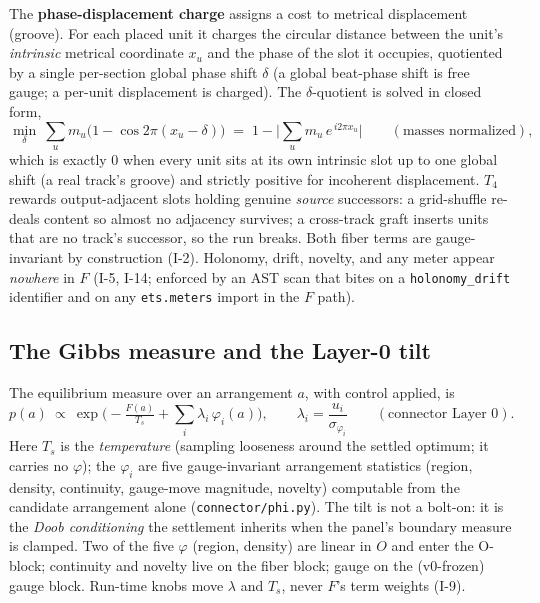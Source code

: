 \documentclass[11pt]{article}
\newcommand{\code}[1]{\texttt{\small #1}}
\begin{document}
The \textbf{phase-displacement charge} assigns a cost to metrical displacement
(groove). For each placed unit it charges the circular distance between the unit's
\emph{intrinsic} metrical coordinate $x_u$ and the phase of the slot it occupies,
quotiented by a single per-section global phase shift $\delta$ (a global
beat-phase shift is free gauge; a per-unit displacement is charged). The
$\delta$-quotient is solved in closed form,
\begin{equation}
  \min_{\delta}\ \sum_u m_u\big(1-\cos 2\pi(x_u-\delta)\big)
  \;=\; 1-\Big|\textstyle\sum_u m_u\, e^{\,i 2\pi x_u}\Big|
  \qquad(\text{masses normalized}),
  \label{eq:phase}
\end{equation}
which is exactly $0$ when every unit sits at its own intrinsic slot up to one
global shift (a real track's groove) and strictly positive for incoherent
displacement. $T_4$ rewards output-adjacent slots holding genuine \emph{source}
successors: a grid-shuffle re-deals content so almost no adjacency survives; a
cross-track graft inserts units that are no track's successor, so the run breaks.
Both fiber terms are gauge-invariant by construction (I-2). Holonomy, drift,
novelty, and any meter appear \emph{nowhere} in $F$ (I-5, I-14; enforced by an AST
scan that bites on a \code{holonomy\_drift} identifier and on any \code{ets.meters}
import in the $F$ path).

\subsection{The Gibbs measure and the Layer-0 tilt}

The equilibrium measure over an arrangement $a$, with control applied, is
\begin{equation}
  p(a)\ \propto\ \exp\!\Big(-\tfrac{F(a)}{T_s} + \sum_i \lambda_i\,\varphi_i(a)\Big),
  \qquad \lambda_i = \frac{u_i}{\sigma_{\varphi_i}}
  \qquad(\text{connector Layer 0}).
  \label{eq:gibbs}
\end{equation}
Here $T_s$ is the \emph{temperature} (sampling looseness around the settled
optimum; it carries no $\varphi$); the $\varphi_i$ are five gauge-invariant
arrangement statistics (region, density, continuity, gauge-move magnitude,
novelty) computable from the candidate arrangement alone (\code{connector/phi.py}).
The tilt is not a bolt-on: it is the \emph{Doob conditioning} the settlement
inherits when the panel's boundary measure is clamped. Two of the five $\varphi$
(region, density) are linear in $O$ and enter the O-block; continuity and novelty
live on the fiber block; gauge on the (v0-frozen) gauge block. Run-time knobs move
$\lambda$ and $T_s$, never $F$'s term weights (I-9).
\end{document}
